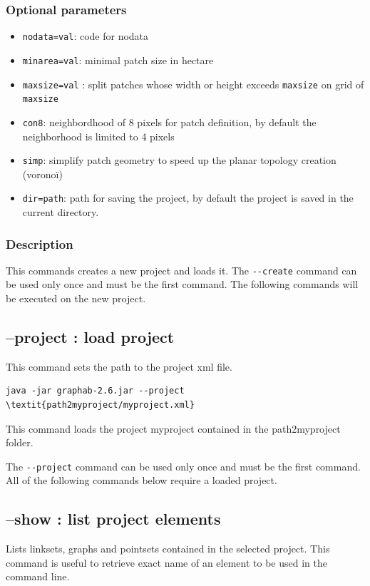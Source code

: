 \documentclass[a4paper,10pt]{report}
\begin{document}
\subsubsection{Optional parameters}
\begin{itemize}
	\item \verb|nodata=val|: code for nodata
	\item \verb|minarea=val|: minimal patch size in hectare
	\item \verb|maxsize=val| : split patches whose width or height exceeds \verb|maxsize| on grid of \verb|maxsize|
	\item \verb|con8|: neighbordhood of 8 pixels for patch definition, by default the neighborhood is limited to 4 pixels
	\item \verb|simp|: simplify patch geometry to speed up the planar topology creation (voronoï)
	\item \verb|dir=path|: path for saving the project, by default the project is saved in the current directory.
\end{itemize}

\subsubsection{Description}
This commands creates a new project and loads it.
The \verb|--create| command can be used only once and must be the first command.
The following commands will be executed on the new project.

\subsection{--project : load project}
This command sets the path to the project xml file.
\begin{Verbatim}[commandchars=\\\{\}]
java -jar graphab-2.6.jar --project \textit{path2myproject/myproject.xml}
\end{Verbatim}
This command loads the project myproject contained in the path2myproject folder.

The \verb|--project| command can be used only once and must be the first command.
All of the following commands below require a loaded project. 

\subsection{--show : list project elements}
Lists linksets, graphs and pointsets contained in the selected project. This command is useful to retrieve exact name of an element to be used in the command line.
\end{document}
